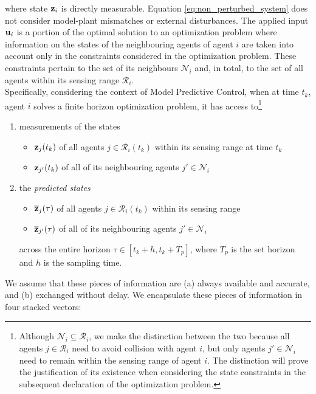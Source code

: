 where state $\bm{\mathbf{z}}_i$ is directly measurable. Equation
\ref{eq:non_perturbed_system} does not consider model-plant mismatches or
external disturbances. The applied input $\bm{\mathbf{u}}_i$ is a portion of the
optimal solution to an optimization problem where information on the states
of the neighbouring agents of agent $i$ are taken into account only in the
constraints considered in the optimization problem. These constraints pertain
to the set of its neighbours $\mathcal{N}_i$ and, in total, to the set of
all agents within its sensing range $\mathcal{R}_i$.\\

Specifically, considering the context of Model Predictive Control, when
at time $t_k$, agent $i$ solves a finite horizon optimization problem, it has
access to\footnote{Although
    $\mathcal{N}_i \subseteq \mathcal{R}_i$, we make the distinction between
    the two because all agents $j \in \mathcal{R}_i$ need to avoid collision
    with agent $i$, but only agents $j' \in \mathcal{N}_i$ need to remain
    within the sensing range of agent $i$. The distinction will prove the
    justification of its existence when considering the state constraints
    in the subsequent declaration of the optimization problem.}

\begin{enumerate}
  \item measurements of the states
    \begin{itemize}
      \item $\bm{\mathbf{z}}_j(t_k)$ of all agents $j \in \mathcal{R}_i(t_k)$ within its sensing range at time $t_k$
      \item $\bm{\mathbf{z}}_{j'}(t_k)$ of all of its neighbouring agents $j' \in \mathcal{N}_i$
      \end{itemize}
    \item the \textit{predicted states}
      \begin{itemize}
        \item $\overline{\bm{\mathbf{z}}}_j(\tau)$ of all agents $j \in \mathcal{R}_i(t_k)$ within its sensing range
        \item $\overline{\bm{\mathbf{z}}}_{j'}(\tau)$ of all of its neighbouring agents $j' \in \mathcal{N}_i$
      \end{itemize}
      across the entire horizon $\tau \in [t_k + h, t_k + T_p]$, where $T_p$ is the
      set horizon and $h$ is the sampling time.
\end{enumerate}
We assume that these pieces of information are (a) always available and
accurate, and (b) exchanged without delay. We encapsulate these pieces of
information in four stacked vectors:

